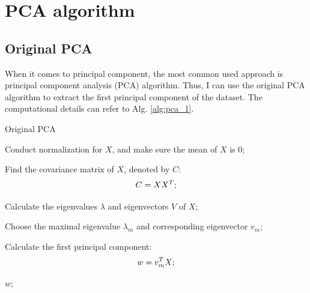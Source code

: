 \documentclass[12pt,a4paper]{article}
\theoremstyle{definition}
\begin{document}
\noindent
\noindent{}

\section{PCA algorithm}

\subsection{Original PCA}
When it comes to principal component, the most common used approach is principal component analysis (PCA) algorithm. Thus, I can use the original PCA algorithm to extract the first principal component of the dataset. The computational details can refer to Alg. \ref{alg:pca_1}.

\vspace{0.01\linewidth}
\begin{algorithm}[H]
	\caption{Original PCA}
	\label{alg:pca_1}
	\vspace{0.25\baselineskip}
	
	
	Conduct normalization for $X$, and make sure the mean of $X$ is 0;
	
	Find the covariance matrix of $X$, denoted by $C$:
	\begin{equation*}
		\centering
		C = XX^{T};
	\end{equation*}
	
	Calculate the eigenvalues $\lambda$ and eigenvectors $V$ of $X$;
	
	Choose the maximal eigenvalue $\lambda_{m}$ and corresponding eigenvector $v_{m}$;
	
	Calculate the first principal component:
	\begin{equation*}
		\centering
		w = v_{m}^{T}X;
	\end{equation*}
	
	\Return $w$;
\end{algorithm}
\vspace{0.01\linewidth}
\end{document}
